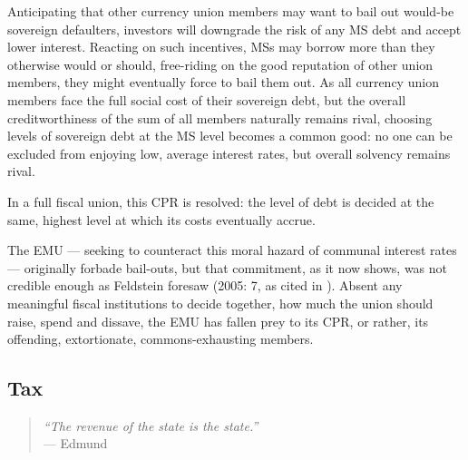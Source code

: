 \documentclass[11pt,a4paper,oneside,openright]{article}
\begin{document}
Anticipating that other currency union members may want to bail out would-be sovereign defaulters, investors will downgrade the risk of any \gls{MS} debt and accept lower interest. 
Reacting on such incentives, \glspl{MS} may borrow more than they otherwise would or should, free-riding on the good reputation of other union members, they might eventually force to bail them out. 
As all currency union members face the full social cost of their sovereign debt, but the overall creditworthiness of the sum of all members naturally remains rival, choosing levels of sovereign debt at the \gls{MS} level becomes a common good: 
no one can be excluded from enjoying low, average interest rates, but overall solvency remains rival.

In a full fiscal union, this \gls{CPR} is resolved: 
the level of debt is decided at the same, highest level at which its costs eventually accrue. 

The \gls{EMU} --- seeking to counteract this moral hazard of communal interest rates --- originally forbade bail-outs, but that commitment, as it now shows, was not credible enough as Feldstein foresaw (2005: 7, as cited in \citealt[13]{Begg2008}). 
Absent any meaningful fiscal institutions to decide together, how much the union should raise, spend and dissave, the \gls{EMU} has fallen prey to its \gls{CPR}, or rather, its offending, extortionate, commons-exhausting members. 

\subsection{Tax}

\begin{quote}
	\emph{``The revenue of the state \emph{is} the state.''}\\
	--- Edmund \cite[111, emphasis added]{Burke1790}
\end{quote}
\end{document}
